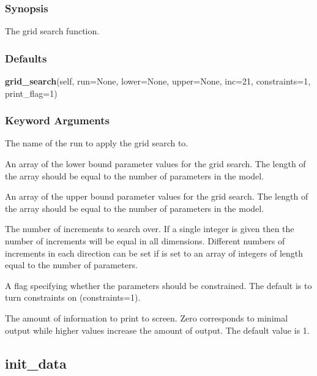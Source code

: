 \subsubsection{Synopsis}

The grid search function.



\subsubsection{Defaults}

\textsf{\textbf{grid\_search}(self, run=None, lower=None, upper=None, inc=21, constraints=1, print\_flag=1)}


\subsubsection{Keyword Arguments}

  The name of the run to apply the grid search to. 

  An array of the lower bound parameter values for the grid search.  The length of the array should be equal to the number of parameters in the model. 

  An array of the upper bound parameter values for the grid search.  The length of the array should be equal to the number of parameters in the model. 

  The number of increments to search over.  If a single integer is given then the number of increments will be equal in all dimensions.  Different numbers of increments in each direction can be set if  is set to an array of integers of length equal to the number of parameters. 

  A flag specifying whether the parameters should be constrained.  The default is to turn constraints on (constraints=1). 

  The amount of information to print to screen.  Zero corresponds to minimal output while higher values increase the amount of output.  The default value is 1. 





\newpage

\subsection{init\_data}


